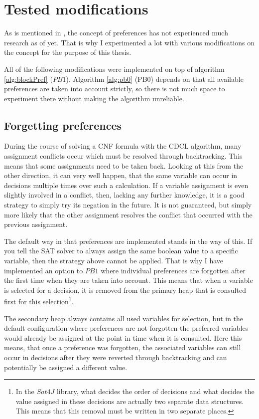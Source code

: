 \section{Tested modifications}
As is mentioned in \cite{PJ18}, the concept of preferences has not experienced much research as of yet. That is why I experimented a lot with various modifications on the concept for the purpose of this thesis.

All of the following modifications were implemented on top of algorithm \ref{alg:blockPref} ($PB1$). Algorithm \ref{alg:pb0} (PB0) depends on that all available preferences are taken into account strictly, so there is not much space to experiment there without making the algorithm unreliable. 


\subsection{Forgetting preferences}
\label{sec:amnesPrefs}
During the course of solving a CNF formula with the CDCL algorithm, many assignment conflicts occur which must be resolved through backtracking. This means that some assignments need to be taken back. Looking at this from the other direction, it can very well happen, that the same variable can occur in decisions multiple times over such a calculation. If a variable assignment is even slightly involved in a conflict, then, lacking any further knowledge, it is a good strategy to simply try its negation in the future. It is not guaranteed, but simply more likely that the other assignment resolves the conflict that occurred with the previous assignment. 

The default way in that preferences are implemented stands in the way of this. If you tell the SAT solver to always assign the same boolean value to a specific variable, then the strategy above cannot be applied. That is why I have implemented an option to $PB1$ where individual preferences are forgotten after the first time when they are taken into account. This means that when a variable is selected for a decision, it is removed from the primary heap that is consulted first for this selection\footnote{
	In the $Sat4J$ library, what decides the order of decisions and what decides the value assigned in these decisions are actually two separate data structures. This means that this removal must be written in two separate places.
}. 

The secondary heap always contains all used variables for selection, but in the default configuration where preferences are not forgotten the preferred variables would already be assigned at the point in time when it is consulted. Here this means, that once a preference was forgotten, the associated variables can still occur in decisions after they were reverted through backtracking and can potentially be assigned a different value. 

